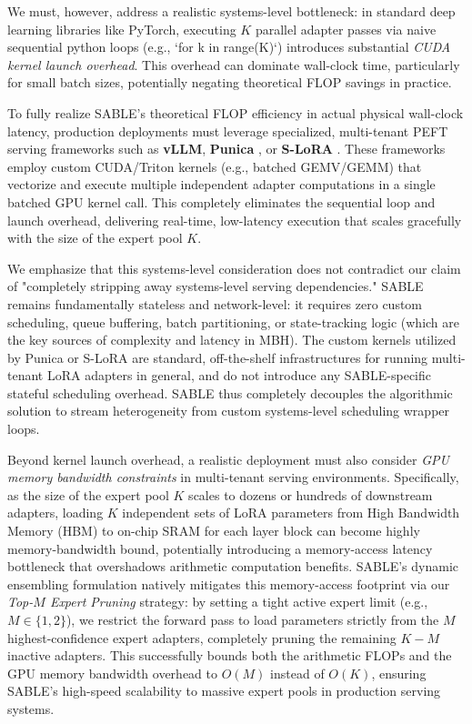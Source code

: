 \begin{itemize}
    We must, however, address a realistic systems-level bottleneck: in standard deep learning libraries like PyTorch, executing $K$ parallel adapter passes via naive sequential python loops (e.g., `for k in range(K)`) introduces substantial \emph{CUDA kernel launch overhead}. This overhead can dominate wall-clock time, particularly for small batch sizes, potentially negating theoretical FLOP savings in practice. 
    
    To fully realize SABLE's theoretical FLOP efficiency in actual physical wall-clock latency, production deployments must leverage specialized, multi-tenant PEFT serving frameworks such as \textbf{vLLM}, \textbf{Punica} \cite{punica}, or \textbf{S-LoRA} \cite{slora}. These frameworks employ custom CUDA/Triton kernels (e.g., batched GEMV/GEMM) that vectorize and execute multiple independent adapter computations in a single batched GPU kernel call. This completely eliminates the sequential loop and launch overhead, delivering real-time, low-latency execution that scales gracefully with the size of the expert pool $K$. 
    
    We emphasize that this systems-level consideration does not contradict our claim of "completely stripping away systems-level serving dependencies." SABLE remains fundamentally stateless and network-level: it requires zero custom scheduling, queue buffering, batch partitioning, or state-tracking logic (which are the key sources of complexity and latency in MBH). The custom kernels utilized by Punica or S-LoRA are standard, off-the-shelf infrastructures for running multi-tenant LoRA adapters in general, and do not introduce any SABLE-specific stateful scheduling overhead. SABLE thus completely decouples the algorithmic solution to stream heterogeneity from custom systems-level scheduling wrapper loops.

    Beyond kernel launch overhead, a realistic deployment must also consider \emph{GPU memory bandwidth constraints} in multi-tenant serving environments. Specifically, as the size of the expert pool $K$ scales to dozens or hundreds of downstream adapters, loading $K$ independent sets of LoRA parameters from High Bandwidth Memory (HBM) to on-chip SRAM for each layer block can become highly memory-bandwidth bound, potentially introducing a memory-access latency bottleneck that overshadows arithmetic computation benefits. SABLE's dynamic ensembling formulation natively mitigates this memory-access footprint via our \emph{Top-$M$ Expert Pruning} strategy: by setting a tight active expert limit (e.g., $M \in \{1, 2\}$), we restrict the forward pass to load parameters strictly from the $M$ highest-confidence expert adapters, completely pruning the remaining $K - M$ inactive adapters. This successfully bounds both the arithmetic FLOPs and the GPU memory bandwidth overhead to $O(M)$ instead of $O(K)$, ensuring SABLE's high-speed scalability to massive expert pools in production serving systems.
    

\end{itemize}
